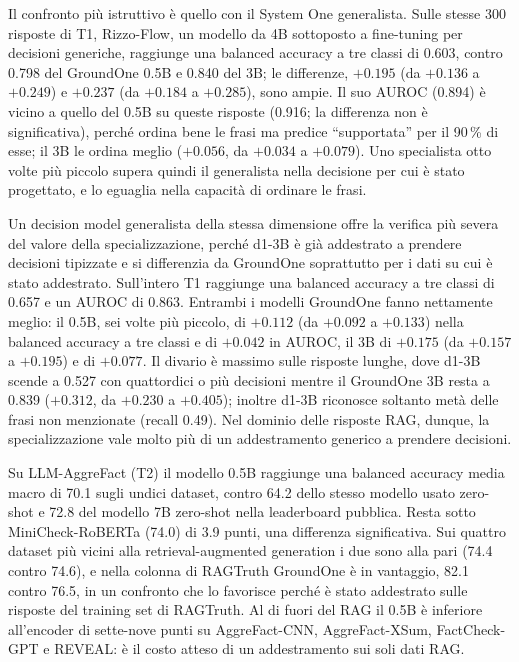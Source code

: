 Il confronto più istruttivo è quello con il System One generalista. Sulle stesse 300 risposte di T1, Rizzo-Flow, un
modello da 4B sottoposto a fine-tuning per decisioni generiche, raggiunge una balanced accuracy a tre classi di 0.603,
contro 0.798 del GroundOne 0.5B e 0.840 del 3B; le differenze, $+0.195$ (da $+0.136$ a $+0.249$) e $+0.237$ (da
$+0.184$ a $+0.285$), sono ampie. Il suo AUROC (0.894) è vicino a quello del 0.5B su queste risposte (0.916; la
differenza non è significativa), perché ordina bene le frasi ma predice ``supportata'' per il 90\,\% di esse; il 3B le
ordina meglio ($+0.056$, da $+0.034$ a $+0.079$). Uno specialista otto volte più piccolo supera quindi il generalista
nella decisione per cui è stato progettato, e lo eguaglia nella capacità di ordinare le frasi.

Un decision model generalista della stessa dimensione offre la verifica più severa del valore della specializzazione,
perché d1-3B è già addestrato a prendere decisioni tipizzate e si differenzia da GroundOne soprattutto per i dati su cui
è stato addestrato. Sull'intero T1 raggiunge una balanced accuracy a tre classi di 0.657 e un AUROC di 0.863. Entrambi i
modelli GroundOne fanno nettamente meglio: il 0.5B, sei volte più piccolo, di $+0.112$ (da $+0.092$ a $+0.133$) nella
balanced accuracy a tre classi e di $+0.042$ in AUROC, il 3B di $+0.175$ (da $+0.157$ a $+0.195$) e di $+0.077$. Il
divario è massimo sulle risposte lunghe, dove d1-3B scende a 0.527 con quattordici o più decisioni mentre il GroundOne
3B resta a 0.839 ($+0.312$, da $+0.230$ a $+0.405$); inoltre d1-3B riconosce soltanto metà delle frasi non menzionate
(recall 0.49). Nel dominio delle risposte RAG, dunque, la specializzazione vale molto più di un addestramento generico a
prendere decisioni.

Su LLM-AggreFact (T2) il modello 0.5B raggiunge una balanced accuracy media macro di 70.1 sugli undici dataset, contro
64.2 dello stesso modello usato zero-shot e 72.8 del modello 7B zero-shot nella leaderboard pubblica. Resta sotto
MiniCheck-RoBERTa (74.0) di 3.9 punti, una differenza significativa. Sui quattro dataset più vicini alla
retrieval-augmented generation i due sono alla pari (74.4 contro 74.6), e nella colonna di RAGTruth GroundOne è in
vantaggio, 82.1 contro 76.5, in un confronto che lo favorisce perché è stato addestrato sulle risposte del training set
di RAGTruth. Al di fuori del RAG il 0.5B è inferiore all'encoder di sette-nove punti su AggreFact-CNN, AggreFact-XSum,
FactCheck-GPT e REVEAL: è il costo atteso di un addestramento sui soli dati RAG.

